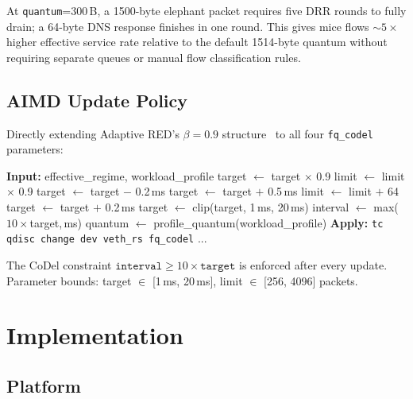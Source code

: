 \documentclass[conference]{IEEEtran}
\begin{document}
At \texttt{quantum}=300\,B, a 1500-byte elephant packet requires five
DRR rounds to fully drain; a 64-byte DNS response finishes in one round. This
gives mice flows $\sim5\times$ higher effective service rate relative to the
default 1514-byte quantum without requiring separate queues or manual flow
classification rules.

\subsection{AIMD Update Policy}

Directly extending Adaptive RED's $\beta=0.9$ structure~\cite{ared2001} to
all four \texttt{fq\_codel} parameters:

\begin{algorithmic}[1]
\STATE \textbf{Input:} effective\_regime, workload\_profile
  \STATE target $\leftarrow$ target $\times$ 0.9
  \STATE limit  $\leftarrow$ limit  $\times$ 0.9
  \STATE target $\leftarrow$ target $-$ 0.2\,ms
  \STATE target $\leftarrow$ target $+$ 0.5\,ms
  \STATE limit  $\leftarrow$ limit  $+$ 64
  \STATE target $\leftarrow$ target $+$ 0.2\,ms
\ENDIF
\STATE target $\leftarrow$ clip(target, 1\,ms, 20\,ms)
\STATE interval $\leftarrow$ max($10\times$target,\,ms)
\STATE quantum $\leftarrow$ profile\_quantum(workload\_profile)
\STATE \textbf{Apply:}
  \texttt{tc qdisc change dev veth\_rs fq\_codel} ...
\end{algorithmic}

The CoDel constraint $\texttt{interval} \geq 10\times\texttt{target}$ is
enforced after every update. Parameter bounds: target $\in$ [1\,ms, 20\,ms],
limit $\in$ [256, 4096] packets.

\section{Implementation}

\subsection{Platform}
\end{document}
